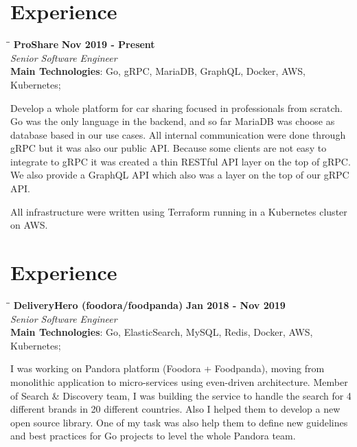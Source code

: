 \documentclass[margin]{res}
\begin{document}
\begin{resume}
\section{Experience}
\vspace{-0.1in}
    \begin{tabbing}
    \hspace{2.3in}\= \hspace{1.7in}\= \kill %
    \textbf{ProShare}    \>\>\textbf{Nov 2019 - Present}\\
    \textit{Senior Software Engineer}\\
    \textbf{Main Technologies}: Go, gRPC, MariaDB, GraphQL, Docker, AWS, Kubernetes;
    \end{tabbing}\vspace{-20pt}      %
    \vspace{2mm}
Develop a whole platform for car sharing focused in professionals from scratch. Go was the only language in the backend, and so far MariaDB was choose as database based in our use cases. All internal communication were done through gRPC but it was also our public API. Because some clients are not easy to integrate to gRPC it was created a thin RESTful API layer on the top of gRPC. We also provide a GraphQL API which also was a layer on the top of our gRPC API.

All infrastructure were written using Terraform running in a Kubernetes cluster on AWS.

\section{Experience}
\vspace{-0.1in}
    \begin{tabbing}
    \hspace{2.3in}\= \hspace{1.7in}\= \kill %
    \textbf{DeliveryHero (foodora/foodpanda)}    \>\>\textbf{Jan 2018 - Nov 2019}\\
    \textit{Senior Software Engineer}\\
    \textbf{Main Technologies}: Go, ElasticSearch, MySQL, Redis, Docker, AWS, Kubernetes;
    \end{tabbing}\vspace{-20pt}      %
    \vspace{2mm}
I was working on Pandora platform (Foodora + Foodpanda), moving from monolithic application to micro-services using even-driven architecture. Member of Search & Discovery team, I was building the service to handle the search for 4 different brands in 20 different countries.
Also I helped them to develop a new open source library. One of my task was also help them to define new guidelines and best practices for Go projects to level the whole Pandora team.


\end{resume}
\end{document}
